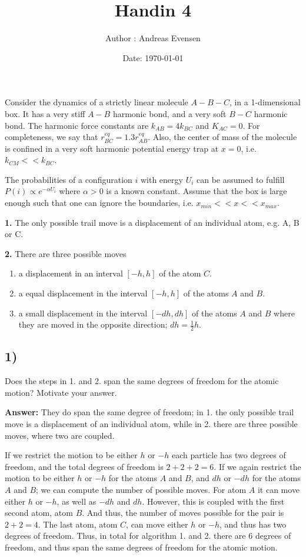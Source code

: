 \documentclass[a4paper]{article}
\title{Handin 4}
\author{Author : Andreas Evensen}
\date{Date: \today}
\newcommand{\newparagraph}{\vspace{.5cm}\noindent}
\begin{document}
\maketitle
\noindent
Consider the dynamics of a strictly linear molecule $A-B-C$, in a 1-dimensional box.
It has a very stiff $A-B$ harmonic bond, and a very soft $B-C$ harmonic bond. The harmonic force constants are $k_{AB} = 4k_{BC}$ and $K_{AC} = 0$.
For completeness, we say that $r_{BC}^{eq} = 1.3 r_{AB}^{eq}$. Also, the center of mass of the molecule is confined in a very soft harmonic potential energy trap at $x = 0$, i.e. $k_{CM} << k_{BC}$.

\newparagraph
The probabilities of a configuration $i$ with energy $U_i$ can be assumed to fulfill $P(i)\propto e^{-\alpha U_i}$ where $\alpha > 0$ is a known constant.
Assume that the box is large enough such that one can ignore the boundaries, i.e. $x_{min} << x << x_{max}$.

\newparagraph
{\color{red}\textbf{1.} The only possible trail move is a displacement of an individual atom, e.g. A, B or C.}

\newparagraph
{\color{blue}\textbf{2.} There are three possible moves
\begin{enumerate}
    \item a displacement in an interval $[-h, h]$ of the atom $C$.
    \item a equal displacement in the interval $[-h, h]$ of the atoms $A$ and $B$.
    \item a small displacement in the interval $[-dh, dh]$ of the atoms $A$ and $B$ where they are moved in the opposite direction; $dh = \frac{1}{2}h$.
\end{enumerate}
}

\subsection*{1)}
Does the steps in {\color{red} 1.} and {\color{blue} 2.} span the same degrees of freedom for the atomic motion? Motivate your answer.

\newparagraph
\textbf{Answer: }They do span the same degree of freedom; in {\color{red} 1.} the only possible trail move is a displacement of an individual atom, while in {\color{blue} 2.} there are three possible moves, where two are coupled.

\newparagraph
If we restrict the motion to be either $h$ or $-h$ each particle has two degrees of freedom, and the total degrees of freedom is $2 + 2 + 2 = 6$.
If we again restrict the motion to be either $h$ or $-h$ for the atoms $A$ and $B$, and $dh$ or $-dh$ for the atoms $A$ and $B$; we can compute the number of possible moves.
For atom $A$ it can move either $h$ or $-h$, as well as $-dh$ and $dh$. However, this is coupled with the first second atom, atom $B$. And thus, the number of moves possible for the pair is $2 + 2 = 4$.
The last atom, atom $C$, can move either $h$ or $-h$, and thus has two degrees of freedom. Thus, in total for algorithm {\color{red} 1.} and {\color{blue} 2.} there are 6 degrees of freedom, and thus span the same degrees of freedom for the atomic motion.
\end{document}
